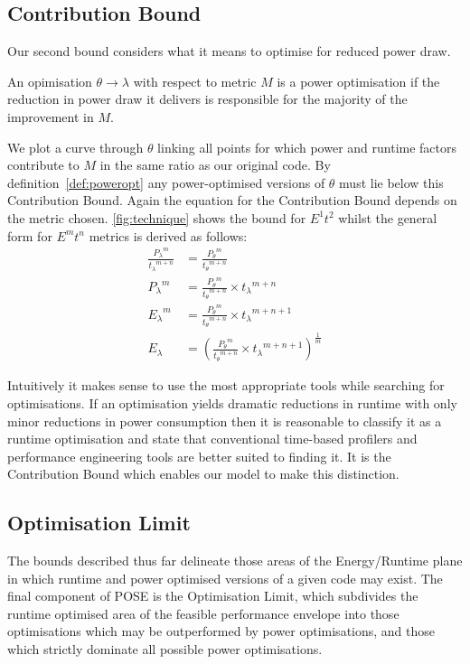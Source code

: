 \subsection{Contribution Bound}
Our second bound considers what it means to optimise for reduced power draw.

\begin{definition}
An opimisation $\theta \to \lambda$ with respect to metric $M$ is a power optimisation if the reduction in power draw it delivers is responsible for the majority of the improvement in $M$.
\label{def:poweropt}
\end{definition}

We plot a curve through $\theta$ linking all points for which power and runtime factors contribute to $M$ in the same ratio as our original code.
By definition~\ref{def:poweropt} any power-optimised versions of $\theta$ must lie below this Contribution Bound.
Again the equation for the Contribution Bound depends on the metric chosen. 
\autoref{fig:technique} shows the bound for $E^1t^2$ whilst the general form for $E^mt^n$ metrics is derived as follows:
\begin{align}
\frac{{P_{\lambda}}^m}{{t_{\lambda}}^{m+n}} &= \frac{{P_{\theta}}^m}{{t_{\theta}}^{m+n}} \nonumber \\
 {P_{\lambda}}^m &= \frac{{P_{\theta}}^m}{{t_{\theta}}^{m+n}} \times {t_\lambda}^{m+n} \nonumber \\ 
 {E_{\lambda}}^m &= \frac{{P_{\theta}}^m}{{t_{\theta}}^{m+n}} \times {t_\lambda}^{m+n+1} \nonumber \\ 
  E_{\lambda} &= (\frac{{P_{\theta}}^m}{{t_{\theta}}^{m+n}} \times {t_\lambda}^{m+n+1})^{\frac{1}{m}} 
\end{align}

Intuitively it makes sense to use the most appropriate tools while searching for optimisations.
If an optimisation yields dramatic reductions in runtime with only minor reductions in power consumption then it is reasonable to classify it as a runtime optimisation and state that conventional time-based profilers and performance engineering tools are better suited to finding it.
It is the Contribution Bound which enables our model to make this distinction.
\subsection{Optimisation Limit}
The bounds described thus far delineate those areas of the Energy/Runtime plane in which runtime and power optimised versions of a given code may exist.
The final component of POSE is the Optimisation Limit, which subdivides the runtime optimised area of the feasible performance envelope into those optimisations which may be outperformed by power optimisations, and those which strictly dominate all possible power optimisations.

